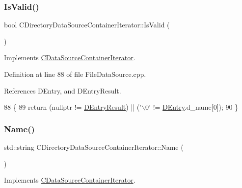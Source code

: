 \subsubsection{\texorpdfstring{Is\+Valid()}{IsValid()}}
{\footnotesize\ttfamily bool C\+Directory\+Data\+Source\+Container\+Iterator\+::\+Is\+Valid (\begin{DoxyParamCaption}{ }\end{DoxyParamCaption})\hspace{0.3cm}{\ttfamily [virtual]}}



Implements \hyperlink{classCDataSourceContainerIterator_ad1e2a9c6bde2f80ed03cb45085ce0441}{C\+Data\+Source\+Container\+Iterator}.



Definition at line 88 of file File\+Data\+Source.\+cpp.



References D\+Entry, and D\+Entry\+Result.


\begin{DoxyCode}
88                                                    \{
89     \textcolor{keywordflow}{return} (\textcolor{keyword}{nullptr} != \hyperlink{classCDirectoryDataSourceContainerIterator_a7e8c1c50ef09013ee6013dcbd1bdc616}{DEntryResult}) || (\textcolor{charliteral}{'\(\backslash\)0'} != \hyperlink{classCDirectoryDataSourceContainerIterator_a69dfb8a9f2ab7f71e7d106d4d6c0e29b}{DEntry}.d\_name[0]);
90 \}
\end{DoxyCode}
\hypertarget{classCDirectoryDataSourceContainerIterator_a24631e9ef36d3cb075e42d38912049ec}{}\label{classCDirectoryDataSourceContainerIterator_a24631e9ef36d3cb075e42d38912049ec} 
\subsubsection{\texorpdfstring{Name()}{Name()}}
{\footnotesize\ttfamily std\+::string C\+Directory\+Data\+Source\+Container\+Iterator\+::\+Name (\begin{DoxyParamCaption}{ }\end{DoxyParamCaption})\hspace{0.3cm}{\ttfamily [virtual]}}



Implements \hyperlink{classCDataSourceContainerIterator_a95b57204a76fab1d5a75a01189d5fcc5}{C\+Data\+Source\+Container\+Iterator}.



